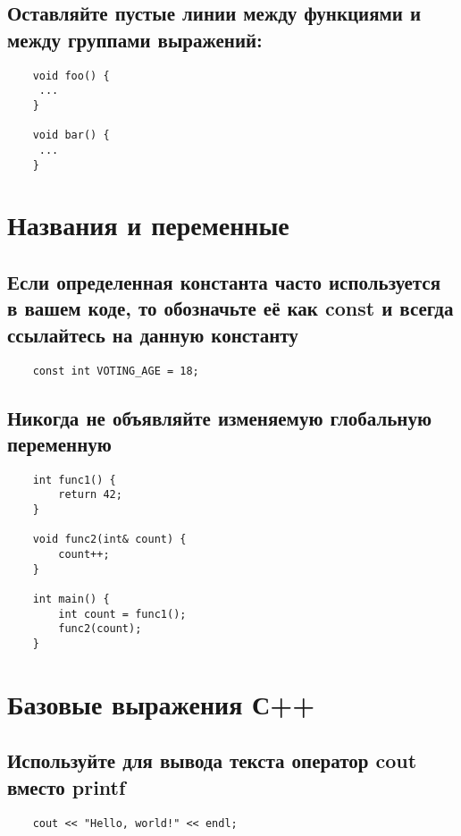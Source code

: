 \documentclass{article}
\begin{document}
        \subsection{Оставляйте пустые линии между функциями и\\ между группами выражений:} 
\begin{lstlisting}
    void foo() {
     ...
    }
                   
    void bar() {
     ...
    }
    \end{lstlisting}
    
    \section{Названия и переменные}
        \subsection{Если определенная константа часто используется в вашем коде, то обозначьте её как const и всегда \\ссылайтесь на данную константу}
            \begin{lstlisting}
    const int VOTING_AGE = 18;
            \end{lstlisting}
            
\newpage
        \subsection{Никогда не объявляйте изменяемую глобальную\\ переменную}
            \begin{lstlisting}
    int func1() {
        return 42;
    }

    void func2(int& count) {
        count++;
    }

    int main() {
        int count = func1();
        func2(count);
    }
            \end{lstlisting}
  
    \section{Базовые выражения С++}
        \subsection{Используйте для вывода текста оператор cout\\ вместо printf }
            \begin{lstlisting}
    cout << "Hello, world!" << endl;
            \end{lstlisting}
            
\end{document}
